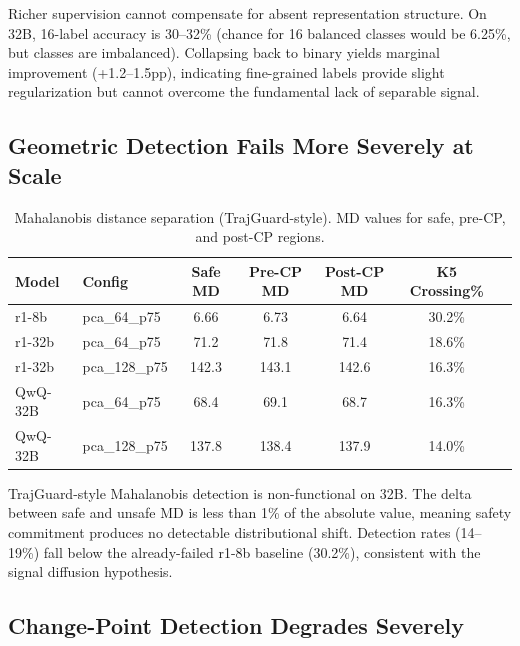 \documentclass[11pt]{article}
\begin{document}
Richer supervision cannot compensate for absent representation structure. On 32B, 16-label accuracy is 30--32\% (chance for 16 balanced classes would be 6.25\%, but classes are imbalanced). Collapsing back to binary yields marginal improvement (+1.2--1.5pp), indicating fine-grained labels provide slight regularization but cannot overcome the fundamental lack of separable signal.

\subsection{Geometric Detection Fails More Severely at Scale}

\begin{table}[h]
\centering
\caption{Mahalanobis distance separation (TrajGuard-style). MD values for safe, pre-CP, and post-CP regions.}
\label{tab:mahal}
\small
\begin{tabular}{llccccc}
\toprule
Model & Config & Safe MD & Pre-CP MD & Post-CP MD & K5 Crossing\% \\
\midrule
r1-8b & pca\_64\_p75 & 6.66 & 6.73 & 6.64 & 30.2\% \\
r1-32b & pca\_64\_p75 & 71.2 & 71.8 & 71.4 & 18.6\% \\
r1-32b & pca\_128\_p75 & 142.3 & 143.1 & 142.6 & 16.3\% \\
QwQ-32B & pca\_64\_p75 & 68.4 & 69.1 & 68.7 & 16.3\% \\
QwQ-32B & pca\_128\_p75 & 137.8 & 138.4 & 137.9 & 14.0\% \\
\bottomrule
\end{tabular}
\end{table}

TrajGuard-style Mahalanobis detection is non-functional on 32B. The delta between safe and unsafe MD is less than 1\% of the absolute value, meaning safety commitment produces no detectable distributional shift. Detection rates (14--19\%) fall below the already-failed r1-8b baseline (30.2\%), consistent with the signal diffusion hypothesis.

\subsection{Change-Point Detection Degrades Severely}
\end{document}
